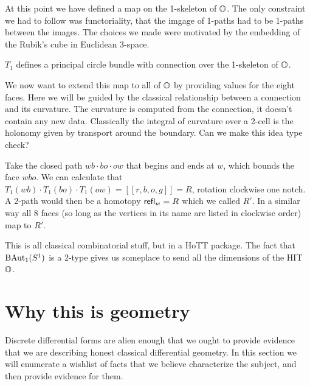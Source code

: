 \documentclass[12pt]{article}
\begin{document}
At this point we have defined a map on the 1-skeleton of \( \mathbb{O} \). The only constraint we had to follow was functoriality, that the imgage of 1-paths had to be 1-paths between the images. The choices we made were motivated by the embedding of the Rubik's cube in Euclidean 3-space.

\begin{myclaim}
\( T_1 \) defines a principal circle bundle with connection over the 1-skeleton of \( \mathbb{O} \).
\end{myclaim}

We now want to extend this map to all of \( \mathbb{O} \) by providing values for the eight faces. Here we will be guided by the classical relationship between a connection and its curvature. The curvature is computed from the connection, it doesn't contain any new data. Classically the integral of curvature over a 2-cell is the holonomy given by transport around the boundary. Can we make this idea type check?

Take the closed path \( wb\cdot bo\cdot ow \) that begins and ends at \( w \), which bounds the face \( wbo \). We can calculate that \( T_1(wb)\cdot T_1(bo)\cdot T_1(ow) = [[r, b, o, g]] = R \), rotation clockwise one notch. A 2-path would then be a homotopy \( \mathsf{refl}_w=R \) which we called \( R' \). In a similar way all 8 faces (so long as the vertices in its name are listed in clockwise order) map to \( R' \).

This is all classical combinatorial stuff, but in a HoTT package. The fact that \( \mathrm{BAut}_1(S^1) \) is a 2-type gives us someplace to send all the dimensions of the HIT \( \mathbb{O} \). 

\section{Why this is geometry}

Discrete differential forms are alien enough that we ought to provide evidence that we are describing honest classical differential geometry. In this section we will enumerate a wishlist of facts that we believe characterize the subject, and then provide evidence for them.
\end{document}
